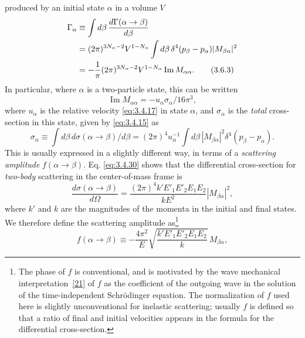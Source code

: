 produced by an initial state $\alpha$ in a volume $V$
\begin{align}
 \Gamma_\alpha&\equiv\int d\beta\,\frac{d\Gamma(\alpha\to\beta)}{d\beta}\notag\\
 &=(2\pi)^{3N_\alpha-2}V^{1-N_\alpha}
 \int d\beta\,\delta^4(p_\beta-p_\alpha)|M_{\beta\alpha}|^2\notag\\
 &=-\frac{1}{\pi}(2\pi)^{3N_\alpha-2}V^{1-N_\alpha}
 \operatorname{Im}M_{\alpha\alpha}.
 \tag{3.6.3}\label{eq:3.6.3}
\end{align}
In particular, where $\alpha$ is a two-particle state, this can be written
\begin{equation}
 \operatorname{Im}M_{\alpha\alpha}=-u_\alpha\sigma_\alpha/16\pi^3,
 \tag{3.6.4}\label{eq:3.6.4}
\end{equation}
where $u_\alpha$ is the relative velocity \eqref{eq:3.4.17} in state $\alpha$, and $\sigma_\alpha$ is the
\emph{total} cross-section in this state, given by \eqref{eq:3.4.15} as
\begin{equation}
 \sigma_\alpha\equiv\int d\beta\,d\sigma(\alpha\to\beta)/d\beta
 =(2\pi)^4u_\alpha^{-1}\int d\beta\,|M_{\beta\alpha}|^2
 \delta^4(p_\beta-p_\alpha).
 \tag{3.6.5}\label{eq:3.6.5}
\end{equation}
This is usually expressed in a slightly different way, in terms of a \emph{scattering amplitude}
$f(\alpha\to\beta)$. Eq. \eqref{eq:3.4.30} shows that the differential cross-section for \emph{two-body}
scattering in the center-of-mass frame is
\begin{equation}
 \frac{d\sigma(\alpha\to\beta)}{d\Omega}
 =\frac{(2\pi)^4k'E'_1E'_2E_1E_2}{kE^2}|M_{\beta\alpha}|^2,
 \tag{3.6.6}\label{eq:3.6.6}
\end{equation}
where $k'$ and $k$ are the magnitudes of the momenta in the initial and final states. We therefore
define the scattering amplitude as\footnote{The phase of $f$ is conventional, and is motivated by
the wave mechanical interpretation~\hyperref[ref:3.21]{[21]} of $f$ as the coefficient of the outgoing wave in the
solution of the time-independent Schrödinger equation. The normalization of $f$ used here is
slightly unconventional for inelastic scattering; usually $f$ is defined so that a ratio of final
and initial velocities appears in the formula for the differential cross-section.}
\begin{equation}
 f(\alpha\to\beta)\equiv-\frac{4\pi^2}{E}
 \sqrt{\frac{k'E'_1E'_2E_1E_2}{k}}\,M_{\beta\alpha},
 \tag{3.6.7}\label{eq:3.6.7}
\end{equation}
